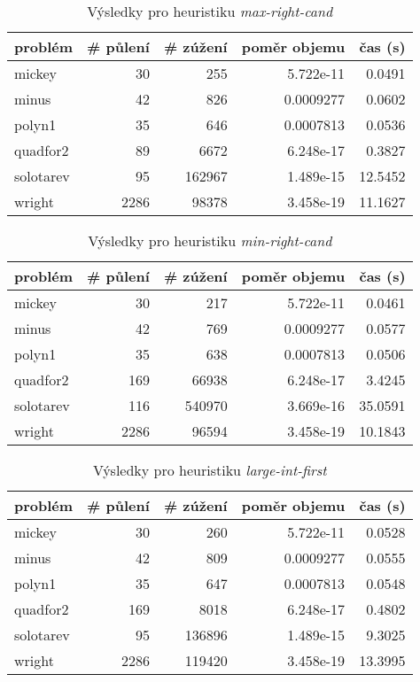 {\begin{table}[H]
\centering
\begin{tabular}{lrrrr}
\hline
problém & \# půlení & \# zúžení & poměr objemu & čas (s) \\ \hline
mickey & 30 & 255 & 5.722e-11 & 0.0491 \\
minus & 42 & 826 & 0.0009277 & 0.0602 \\
polyn1 & 35 & 646 & 0.0007813 & 0.0536 \\
quadfor2 & 89 & 6672 & 6.248e-17 & 0.3827 \\
solotarev & 95 & 162967 & 1.489e-15 & 12.5452 \\
wright & 2286 & 98378 & 3.458e-19 & 11.1627 \\
\end{tabular}
\caption{Výsledky pro heuristiku \emph{max-right-cand}}
\label{max-right-cand}
\end{table}



\begin{table}[H]
\centering
\begin{tabular}{lrrrr}
\hline
problém & \# půlení & \# zúžení & poměr objemu & čas (s) \\ \hline
mickey & 30 & 217 & 5.722e-11 & 0.0461 \\
minus & 42 & 769 & 0.0009277 & 0.0577 \\
polyn1 & 35 & 638 & 0.0007813 & 0.0506 \\
quadfor2 & 169 & 66938 & 6.248e-17 & 3.4245 \\
solotarev & 116 & 540970 & 3.669e-16 & 35.0591 \\
wright & 2286 & 96594 & 3.458e-19 & 10.1843 \\
\end{tabular}
\caption{Výsledky pro heuristiku \emph{min-right-cand}}
\label{min-right-cand}
\end{table}



\begin{table}[H]
\centering
\begin{tabular}{lrrrr}
\hline
problém & \# půlení & \# zúžení & poměr objemu & čas (s) \\ \hline
mickey & 30 & 260 & 5.722e-11 & 0.0528 \\
minus & 42 & 809 & 0.0009277 & 0.0555 \\
polyn1 & 35 & 647 & 0.0007813 & 0.0548 \\
quadfor2 & 169 & 8018 & 6.248e-17 & 0.4802 \\
solotarev & 95 & 136896 & 1.489e-15 & 9.3025 \\
wright & 2286 & 119420 & 3.458e-19 & 13.3995 \\
\end{tabular}
\caption{Výsledky pro heuristiku \emph{large-int-first}}
\label{large-int-first}
\end{table}



}
